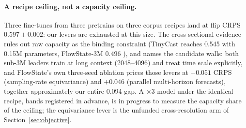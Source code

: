 \paragraph{A recipe ceiling, not a capacity ceiling.}
Three fine-tunes from three pretrains on three corpus recipes land at
flip CRPS $0.597 \pm 0.002$: our levers are exhausted at this size. The
cross-sectional evidence rules out raw capacity as the binding
constraint (TinyCast reaches 0.545 with 0.15M parameters, FlowState-3M
0.496 \citep{flowstate2025}), and names the candidate walls: both
sub-3M leaders train at long context (2048--4096) and treat time scale
explicitly, and FlowState's own three-seed ablation prices those levers
at $+0.051$ CRPS (sampling-rate equivariance) and $+0.046$ (parallel
multi-horizon forecasts), together approximately our entire 0.094 gap.
A $\times 3$ model under the identical recipe, bands registered in
advance, is in progress to measure the capacity share of the ceiling;
the equivariance lever is the unfunded cross-resolution arm of
Section~\ref{sec:objective}.
